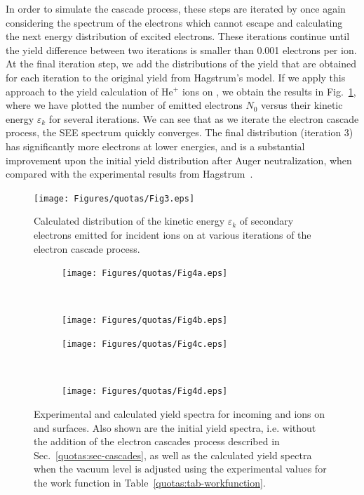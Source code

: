 \begin{refsection}
In order to simulate the cascade process, these steps are iterated by once again considering the spectrum of the electrons which cannot escape and calculating the next energy distribution of excited electrons. These iterations continue until the yield difference between two iterations is smaller than 0.001 electrons per ion. At the final iteration step, we add the distributions of the yield that are obtained for each iteration to the original yield from Hagstrum's model. If we apply this approach to the yield calculation of He$^+$ ions on , we obtain the results in Fig.~\ref{quotas:fig-iterations}, where we have plotted the number of emitted electrons $N_0$ versus their kinetic energy $\varepsilon_k$ for several iterations. We can see that as we iterate the electron cascade process, the SEE spectrum quickly converges. The final distribution (iteration 3) has significantly more electrons at lower energies, and is a substantial improvement upon the initial yield distribution after Auger neutralization, when compared with the experimental results from Hagstrum~\cite{Hagstrum1960}.

\begin{figure}[ht]
\centering
\texttt{[image: Figures/quotas/Fig3.eps]}
\caption{\label{quotas:fig-iterations} Calculated distribution of the kinetic energy $\varepsilon_k$ of secondary electrons emitted for incident  ions on  at various iterations of the electron cascade process.}
\end{figure}

 \label{quotas:sec-semiconductors}

\begin{figure}[t]
    \centering
    \begin{subfigure}[t]{0.49\textwidth}
        \centering
        \texttt{[image: Figures/quotas/Fig4a.eps]}
    \end{subfigure}%
    ~ 
    \begin{subfigure}[t]{0.49\textwidth}
        \centering
        \texttt{[image: Figures/quotas/Fig4b.eps]}
    \end{subfigure}
    \begin{subfigure}[t]{0.49\textwidth}
        \centering
        \texttt{[image: Figures/quotas/Fig4c.eps]}
    \end{subfigure}%
    ~ 
    \begin{subfigure}[t]{0.49\textwidth}
        \centering
        \texttt{[image: Figures/quotas/Fig4d.eps]}
    \end{subfigure}
    \caption{\label{quotas:fig-results_semiconductors} Experimental and calculated yield spectra for incoming  and  ions on  and  surfaces. Also shown are the initial yield spectra, i.e. without the addition of the electron cascades process described in Sec.~\ref{quotas:sec-cascades}, as well as the calculated yield spectra when the vacuum level is adjusted using the experimental values for the work function in Table~\ref{quotas:tab-workfunction}.}
\end{figure}


\end{refsection}
